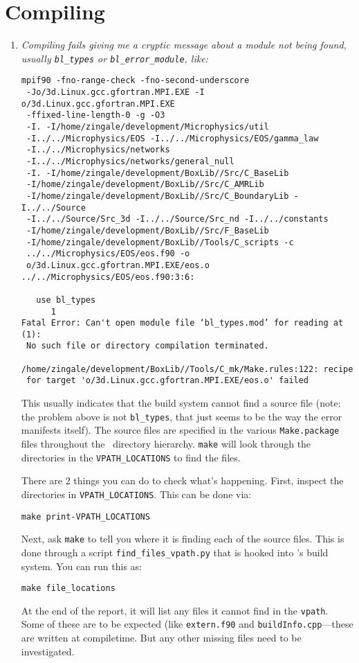 \section{Compiling}

\begin{enumerate}

\item {\em Compiling fails giving me a cryptic message about a module not
  being found, usually {\tt bl\_types} or {\tt bl\_error\_module}, like:
\begin{verbatim}
mpif90 -fno-range-check -fno-second-underscore
 -Jo/3d.Linux.gcc.gfortran.MPI.EXE -I o/3d.Linux.gcc.gfortran.MPI.EXE
 -ffixed-line-length-0 -g -O3
 -I. -I/home/zingale/development/Microphysics/util
 -I../../Microphysics/EOS -I../../Microphysics/EOS/gamma_law
 -I../../Microphysics/networks
 -I../../Microphysics/networks/general_null
 -I. -I/home/zingale/development/BoxLib//Src/C_BaseLib
 -I/home/zingale/development/BoxLib//Src/C_AMRLib
 -I/home/zingale/development/BoxLib//Src/C_BoundaryLib -I../../Source
 -I../../Source/Src_3d -I../../Source/Src_nd -I../../constants
 -I/home/zingale/development/BoxLib//Src/F_BaseLib
 -I/home/zingale/development/BoxLib//Tools/C_scripts -c
 ../../Microphysics/EOS/eos.f90 -o
 o/3d.Linux.gcc.gfortran.MPI.EXE/eos.o
../../Microphysics/EOS/eos.f90:3:6:

   use bl_types
      1
Fatal Error: Can't open module file ‘bl_types.mod’ for reading at (1):
 No such file or directory compilation terminated.

/home/zingale/development/BoxLib//Tools/C_mk/Make.rules:122: recipe
 for target 'o/3d.Linux.gcc.gfortran.MPI.EXE/eos.o' failed
\end{verbatim}
}

This usually indicates that the build system cannot find a source file
(note: the problem above is not {\tt bl\_types}, that just seems to be
the way the error manifests itself).  The source files are specified
in the various {\tt Make.package} files throughout the
\castro\ directory hierarchy.  {\tt make} will look through the
directories in the {\tt VPATH\_LOCATIONS} to find the files.

There are 2 things you can do to check what's happening.  First, inspect
the directories in {\tt VPATH\_LOCATIONS}.  This can be done via:
\begin{verbatim}
make print-VPATH_LOCATIONS
\end{verbatim}

Next, ask {\tt make} to tell you where it is finding each of the source
files.  This is done through a script {\tt find\_files\_vpath.py}
 that is hooked into \castro's build system.  You can run this as:
\begin{verbatim}
make file_locations
\end{verbatim}
At the end of the report, it will list any files it cannot find in
the {\tt vpath}.  Some of these are to be expected (like {\tt extern.f90}
and {\tt buildInfo.cpp}---these are written at compiletime.  But any
other missing files need to be investigated.


\end{enumerate}
